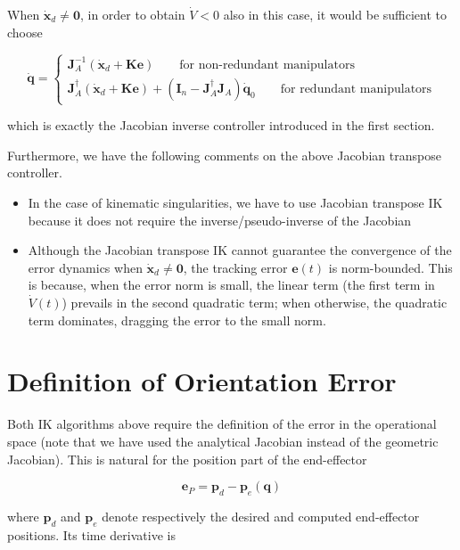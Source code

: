 \documentclass[10pt]{article}
\begin{document}
When  $\dot{\boldsymbol{x}}_{d} \neq \mathbf{0}$, in order to obtain $\dot{V}<0$ also in this case, it would be sufficient to choose 

$$
\dot{\boldsymbol{q}}=
\begin{cases}
\boldsymbol{J}_{A}^{-1}\left(\dot{\boldsymbol{x}}_{d}+\boldsymbol{K} \boldsymbol{e}\right)  \quad\quad\text{for non-redundant manipulators} \\
\boldsymbol{J}_{A}^{\dagger}\left(\dot{\boldsymbol{x}}_{d}+\boldsymbol{K e}\right)+\left(\boldsymbol{I}_{n}-\boldsymbol{J}_{A}^{\dagger} \boldsymbol{J}_{A}\right) \dot{\boldsymbol{q}}_{0} \quad\quad\text{for redundant manipulators}
\end{cases}
$$

which is exactly the Jacobian inverse controller introduced in the first section. 

Furthermore, we have the following comments on the above Jacobian transpose controller.

\begin{itemize}
    \item  In the case of kinematic singularities, we have to use Jacobian transpose IK because it does not require the inverse/pseudo-inverse of the Jacobian

\item  Although the Jacobian transpose IK cannot guarantee the convergence of the error dynamics when $\dot{\boldsymbol{x}}_{d} \neq \mathbf{0}$, the tracking error $\boldsymbol{e}(t)$ is norm-bounded. This is because, when the error norm is small, the linear term (the first term in $\dot{V}(t)$) prevails in the second quadratic term; when otherwise, the quadratic term dominates, dragging the error to the small norm.

\end{itemize}



\section{Definition of Orientation Error}

Both IK algorithms above require the definition of the error in the operational space (note that we have used the analytical Jacobian instead of the geometric Jacobian). This is natural for the position part of the end-effector

$$
\boldsymbol{e}_{P}=\boldsymbol{p}_{d}-\boldsymbol{p}_{e}(\boldsymbol{q})
$$

where $\boldsymbol{p}_{d}$ and $\boldsymbol{p}_{e}$ denote respectively the desired and computed end-effector positions. Its time derivative is
\end{document}
